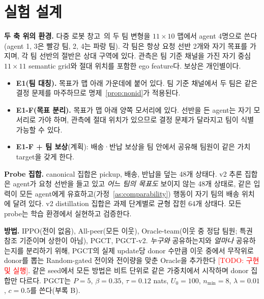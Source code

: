 \documentclass[twocolumn,10pt]{article}
\theoremstyle{remark}
\newcommand{\todo}[1]{\textcolor{red}{[TODO: #1]}}
\newcommand{\ours}{PGCT}
\begin{document}
\section{실험 설계}
\label{sec:setup}
\textbf{두 축 위의 환경.} 다중 로봇 창고~\cite{papoudakis2021benchmarking}의 두 팀 변형을 $11\times10$ 맵에서 agent 4명으로 쓴다(agent 1, 3은 빨강 팀, 2, 4는 파랑 팀).
각 팀은 항상 요청 선반 2개와 자기 목표를 가지며, 각 팀 선반의 절반은 상대 구역에 있다. 관측은 팀 기준 채널을 가진 자기 중심 $11\times11$ semantic grid와 절대 위치를
포함한 ego feature다. 보상은 개인별이다.

\begin{table}[t]
\centering
\small
{}
\caption{분석의 두 축에 놓은 환경. E1: 명제~\ref{prop:nonid}로 식별 가능성이 배제되고, 팀 내 호환성이 팀 간보다 낮게 측정됨. E1-F: 식별 가능성이 기대되며 호환성은 측정 예정.
\todo{측정 후 E1-F 위치 확정}}
\label{tab:axes}
\end{table}

\begin{itemize}
  \item \textbf{E1(팀 대칭).} 목표가 맵 아래 가운데에 붙어 있다. 팀 기준 채널에서 두 팀은 같은 결정 문제를 마주하므로 명제~\ref{prop:nonid}가 적용된다.
  \item \textbf{E1-F(목표 분리).} 목표가 맵 아래 양쪽 모서리에 있다. 선반을 든 agent는 자기 모서리로 가야 하며, 관측에 절대 위치가 있으므로 결정 문제가 달라지고 팀이
    식별 가능할 수 있다.
  \item \textbf{E1-F + 팀 보상}(계획): 배송·반납 보상을 팀 안에서 공유해 팀원이 같은 가치 target을 갖게 한다.
\end{itemize}

\textbf{Probe 집합.} canonical 집합은 pickup, 배송, 반납을 덮는 48개 상태다. v2 추론 집합은 agent가 요청 선반을 들고 있고 \emph{어느 팀의 목표도} 보이지 않는 48개 상태로,
같은 입력이 모든 agent에게 유효하고(가정~\ref{as:comparability}) 행동이 자기 팀의 배송 위치에 달려 있다. v2 distillation 집합은 과제 단계별로 균형 잡힌 64개 상태다. 모든
probe는 학습 환경에서 실현하고 검증한다.

\textbf{방법.} IPPO(전이 없음), All-peer(모든 이웃), Oracle-team(이웃 중 정답 팀원; 특권 참조 기준이며 상한이 아님), \ours{}, \ours{}-v2. \emph{누구와} 공유하는지와
\emph{얼마나} 공유하는지를 분리하기 위해, \ours{}의 실제 update당 donor 수만큼 이웃 중에서 무작위로 donor를 뽑는 Random-gated 전이와 전이량을 맞춘 Oracle을 추가한다
\todo{구현 및 실행}. 같은 seed에서 모든 방법은 비트 단위로 같은 가중치에서 시작하며 donor 집합만 다르다. \ours{}는 $P=5$, $\beta=0.35$, $\tau=0.12$ nats, $U_0=100$,
$n_{\min}=8$, $\lambda=0.01$, $c=0.5$를 쓴다(부록 B).
\end{document}
